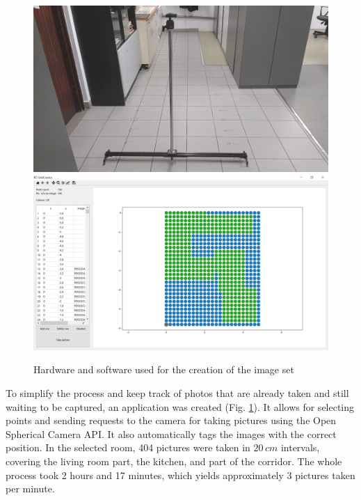 \documentclass[conference]{ieeetran}
\begin{document}
\begin{figure}[!ht]
    \centering
    \includegraphics[width=\columnwidth]{img/rig/calosc.jpg}\\
    \includegraphics[width=\columnwidth]{img/creator.png}\\
    \caption{Hardware and software used for the creation of the image set}
    \label{fig:rig}
\end{figure}

To simplify the process and keep track of photos that are already taken and still waiting to 
be captured, an application was created (Fig. \ref{fig:rig}).
It allows for selecting points and sending requests to the camera for taking pictures using the
Open Spherical Camera API. It also automatically tags the images with the correct position.
In the selected room, 404 pictures were taken in $20\,cm$ intervals, covering the living room part,
the kitchen, and part of the corridor. The whole process took 2 hours and 17 minutes,
which yields approximately 3 pictures taken per minute. 
\end{document}
